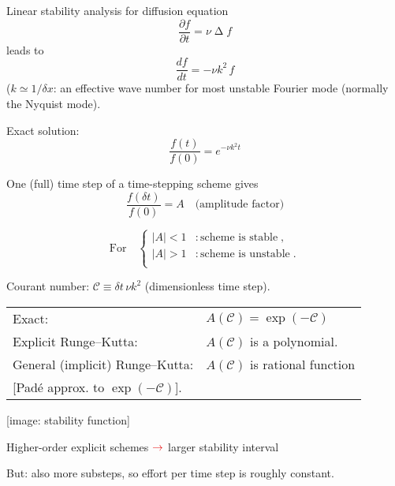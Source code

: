 \documentclass[\mydriver,12pt,twoside,notitlepage]{article}
\newcommand{\ColEmph}[1]{{\color{DarkishRed}#1}}
\newcommand{\RedArrow}{\ensuremath{\ColEmph{\rightarrow}}}
\newcommand{\Courant} {\mathcal{C}}
\newcommand{\Laplace} { \mathop{\Delta}\nolimits}
\begin{document}
Linear stability analysis for diffusion equation
\begin{equation}
  \dfrac{\partial f}{\partial t}
  = \nu \Laplace f
\end{equation}
leads to
\begin{equation}
  \dfrac{df}{dt} = - \nu k^2 \,f
\end{equation}
($k \simeq 1/\delta x$: an effective wave number for most
unstable Fourier mode (normally the Nyquist mode).

Exact solution:
\begin{equation}
  \dfrac{f(t)}{f(0)} = e^{-\nu k^2 t}
\end{equation}

One (full) time step of a time-stepping scheme gives
\begin{equation}
  \dfrac{f(\delta t)}{f(0)} = A
  \quad\text{(amplitude factor)}
\end{equation}

\begin{equation*}
  \text{For} \quad
  \begin{cases}
    |A| < 1 &: \text{scheme is stable} \; , \\
    |A| > 1 &: \text{scheme is unstable} \; . \\
  \end{cases}
\end{equation*}

Courant number: $\Courant \equiv \delta t \, \nu k^2$ (dimensionless time step). 

\clearpage

\begin{tabular}{@{}ll}
  Exact:                           & $A(\Courant) = \exp(-\Courant)$\\[1.5ex]
  Explicit Runge--Kutta:           &  $A(\Courant)$ is a polynomial.\\[1.5ex]
  General (implicit) Runge--Kutta: & $A(\Courant)$ is rational function\\{}
                                     [Padé approx. to $\exp(-\Courant)$].
\end{tabular}

\bigskip

[image: stability function]

Higher-order explicit schemes $\RedArrow$ larger stability interval

But: also more substeps, so effort per time step is roughly constant.

\end{document}
